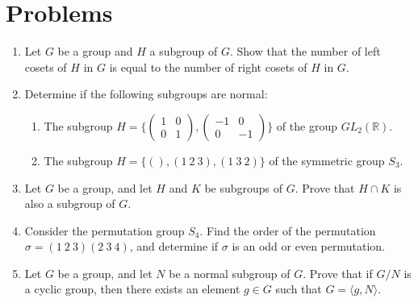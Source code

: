 \section{Problems}

\begin{enumerate}
  \item Let $G$ be a group and $H$ a subgroup of $G$. Show that the number of left cosets of $H$ in $G$ is equal to the number of right cosets of $H$ in $G$.

  \item Determine if the following subgroups are normal:
    \begin{enumerate}
      \item The subgroup $H = \{\begin{pmatrix} 1 & 0 \\ 0 & 1 \end{pmatrix}, \begin{pmatrix} -1 & 0 \\ 0 & -1 \end{pmatrix}\}$ of the group $GL_2(\mathbb{R})$.
      \item The subgroup $H = \{(), (1\ 2\ 3), (1\ 3\ 2)\}$ of the symmetric group $S_3$.
    \end{enumerate}

  \item Let $G$ be a group, and let $H$ and $K$ be subgroups of $G$. Prove that $H \cap K$ is also a subgroup of $G$.

  \item Consider the permutation group $S_4$. Find the order of the permutation $\sigma = (1\ 2\ 3)(2\ 3\ 4)$, and determine if $\sigma$ is an odd or even permutation.

  \item Let $G$ be a group, and let $N$ be a normal subgroup of $G$. Prove that if $G/N$ is a cyclic group, then there exists an element $g \in G$ such that $G = \langle g, N \rangle$.
\end{enumerate}

